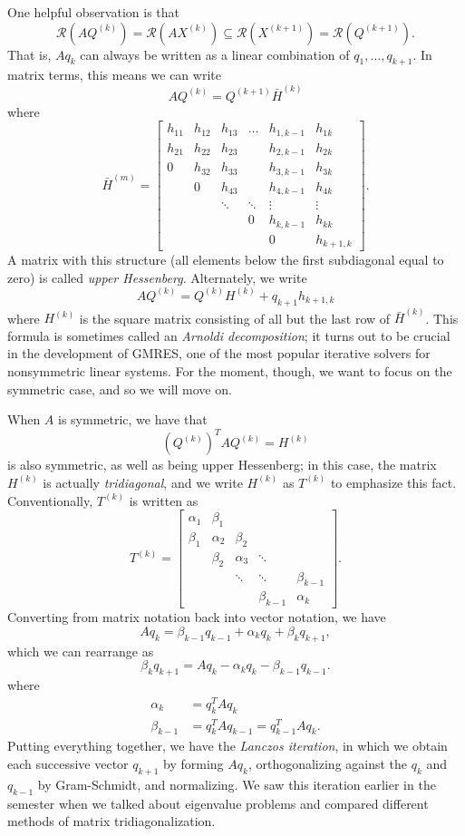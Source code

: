 \documentclass[12pt, leqno]{article}
\newcommand{\calR}{\mathcal{R}}
\begin{document}
One helpful observation is that
\[
  \calR(AQ^{(k)}) = \calR(AX^{(k)}) \subseteq
  \calR(X^{(k+1)}) = \calR(Q^{(k+1)}).
  \]
That is, $Aq_k$ can always be written as a linear combination
of $q_1, \ldots, q_{k+1}$.  In matrix terms, this means we can write
\[
  AQ^{(k)} = Q^{(k+1)} \bar{H}^{(k)}
\]  
where
\[
\bar{H}^{(m)} =
\begin{bmatrix}
  h_{11} & h_{12} & h_{13} & \ldots & h_{1,k-1} & h_{1k} \\
  h_{21} & h_{22} & h_{23} &        & h_{2,k-1} & h_{2k} \\
  0     & h_{32} & h_{33} &        & h_{3,k-1} & h_{3k} \\
        & 0      & h_{43} &       & h_{4,k-1} & h_{4k} \\
        &        & \ddots & \ddots & \vdots & \vdots \\
        &        &        & 0      &  h_{k,k-1} & h_{kk} \\
        &        &        &        &  0        & h_{k+1,k}
\end{bmatrix}.
\]
A matrix with this structure (all elements below the first subdiagonal
equal to zero) is called {\em upper Hessenberg}.  Alternately,
we write
\[
  AQ^{(k)} = Q^{(k)} H^{(k)} + q_{k+1} h_{k+1,k}
\]
where $H^{(k)}$ is the square matrix consisting of all but the last
row of $\bar{H}^{(k)}$.  This formula is sometimes called an
{\em Arnoldi decomposition}; it turns out to be crucial in the
development of GMRES, one of the most popular iterative solvers for
nonsymmetric linear systems.  For the moment, though, we want to
focus on the symmetric case, and so we will move on.

When $A$ is symmetric, we have that
\[
  (Q^{(k)})^T A Q^{(k)} = H^{(k)}
\]
is also symmetric, as well as being upper Hessenberg; in this case,
the matrix $H^{(k)}$ is actually {\em tridiagonal}, and we write
$H^{(k)}$ as $T^{(k)}$ to emphasize this fact.  Conventionally,
$T^{(k)}$ is written as
\[
T^{(k)} =
\begin{bmatrix}
  \alpha_1 & \beta_1 \\
  \beta_1 & \alpha_2 & \beta_2 \\
          & \beta_2 & \alpha_3 & \ddots \\
          &         & \ddots & \ddots & \beta_{k-1} \\
          &         &        & \beta_{k-1} & \alpha_k
\end{bmatrix}.
\]
Converting from matrix notation back into vector notation, we have
\[
  A q_{k} = \beta_{k-1} q_{k-1} + \alpha_k q_k + \beta_k q_{k+1},
\]
which we can rearrange as
\[
  \beta_k q_{k+1} = A q_k - \alpha_k q_k - \beta_{k-1} q_{k-1}. 
\]
where
\begin{align*}
  \alpha_k &= q_k^T A q_k \\
  \beta_{k-1} &= q_k^T A q_{k-1} = q_{k-1}^T A q_k.
\end{align*}
Putting everything together, we have the {\em Lanczos iteration},
in which we obtain each successive vector $q_{k+1}$ by forming $Aq_k$,
orthogonalizing against the $q_k$ and $q_{k-1}$ by Gram-Schmidt,
and normalizing.  We saw this iteration earlier in the semester
when we talked about eigenvalue problems and compared different
methods of matrix tridiagonalization.
\end{document}
